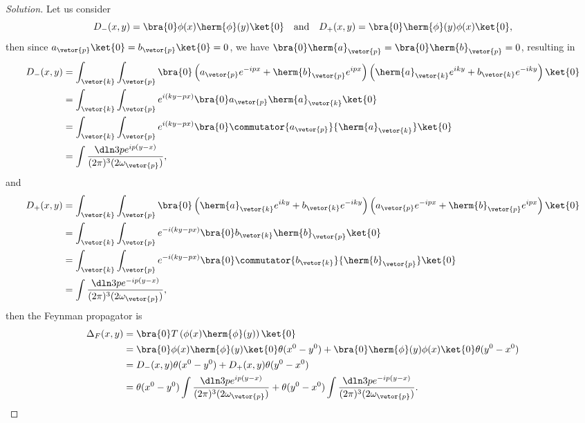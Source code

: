 \begin{proof}[Solution]
   Let us consider
   \begin{equation*}
      D_-(x,y) = \bra{0} \phi(x) \herm{\phi}(y)\ket{0}
      \quad\text{and}\quad
      D_+(x,y) = \bra{0} \herm{\phi}(y) \phi(x) \ket{0},
   \end{equation*}
   then since \(a_{\vetor{p}}\ket{0} = b_{\vetor{p}}\ket{0} = 0\), we have \(\bra{0}\herm{a}_{\vetor{p}}= \bra{0}\herm{b}_{\vetor{p}} = 0\), resulting in
   \begin{align*}
      D_-(x,y) &= \int_{\vetor{k}}  \int_{\vetor{p}}  \bra{0}\left(a_{\vetor{p}} e^{-ipx} + \herm{b}_{\vetor{p}} e^{ipx}\right)\left(\herm{a}_{\vetor{k}} e^{iky} + b_{\vetor{k}} e^{-iky}\right)\ket{0}\\
               &= \int_{\vetor{k}} \int_{\vetor{p}} e^{i(ky - px)} \bra{0} a_{\vetor{p}} \herm{a}_{\vetor{k}} \ket{0}\\
               &= \int_{\vetor{k}} \int_{\vetor{p}} e^{i(ky - px)} \bra{0}  \commutator{a_{\vetor{p}}}{\herm{a}_{\vetor{k}}} \ket{0}\\
               &= \int \frac{\dln3p e^{i p (y - x)}}{(2\pi)^3 (2 \omega_{\vetor{p}})},
   \end{align*}
   and
   \begin{align*}
      D_+(x,y) &= \int_{\vetor{k}}  \int_{\vetor{p}}  \bra{0}\left(\herm{a}_{\vetor{k}} e^{iky} + b_{\vetor{k}} e^{-iky}\right)\left(a_{\vetor{p}} e^{-ipx} + \herm{b}_{\vetor{p}} e^{ipx}\right)\ket{0}\\
               &= \int_{\vetor{k}} \int_{\vetor{p}} e^{-i(ky - px)} \bra{0} b_{\vetor{k}} \herm{b}_{\vetor{p}} \ket{0}\\
               &= \int_{\vetor{k}} \int_{\vetor{p}} e^{-i(ky - px)} \bra{0}  \commutator{b_{\vetor{k}}}{\herm{b}_{\vetor{p}}} \ket{0}\\
               &= \int \frac{\dln3p e^{-i p (y - x)}}{(2\pi)^3 (2 \omega_{\vetor{p}})},
   \end{align*}
   then the Feynman propagator is
   \begin{align*}
      \Delta_F(x,y) &= \bra{0}T\left(\phi(x) \herm{\phi}(y)\right)\ket{0}\\
                    &= \bra{0} \phi(x) \herm{\phi}(y) \ket{0} \theta(x^0 - y^0) + \bra{0} \herm{\phi}(y) \phi(x) \ket{0} \theta(y^0 - x^0)\\
                    &= D_-(x,y) \theta(x^0 - y^0) + D_+(x,y) \theta(y^0 - x^0)\\
                    &= \theta(x^0 - y^0)\int \frac{\dln3p e^{i p (y - x)}}{(2\pi)^3 (2 \omega_{\vetor{p}})} + \theta(y^0 - x^0) \int \frac{\dln3p e^{-i p (y - x)}}{(2\pi)^3 (2 \omega_{\vetor{p}})}.
   \end{align*}


\end{proof}
